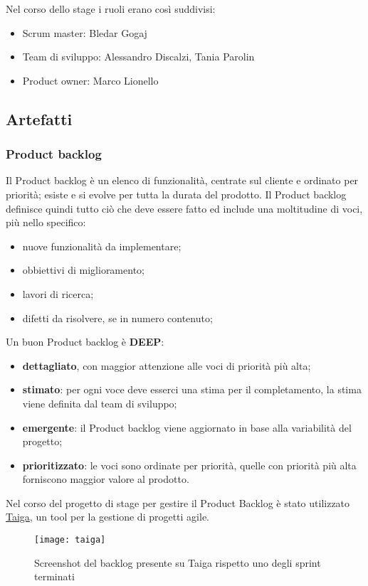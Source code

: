 Nel corso dello stage i ruoli erano così suddivisi:
\begin{itemize}
    \item Scrum master: Bledar Gogaj
    \item Team di sviluppo: Alessandro Discalzi, Tania Parolin
    \item Product owner: Marco Lionello
\end{itemize}

\subsection{Artefatti}

\subsubsection{Product backlog}
Il Product backlog è un elenco di funzionalità, centrate sul cliente e ordinato per priorità; esiste e si evolve per tutta la durata del prodotto. Il Product backlog definisce quindi tutto ciò che deve essere fatto ed include una moltitudine di voci, più nello specifico:
\begin{itemize}
    \item nuove funzionalità da implementare;
    \item obbiettivi di miglioramento;
    \item lavori di ricerca;
    \item difetti da risolvere, se in numero contenuto;
\end{itemize}
Un buon Product backlog è \textbf{DEEP}:
\begin{itemize}
    \item \textbf{dettagliato}, con maggior attenzione alle voci di priorità più alta;
    \item \textbf{stimato}: per ogni voce deve esserci una stima per il completamento, la stima viene definita dal team di sviluppo;
    \item \textbf{emergente}: il Product backlog viene aggiornato in base alla variabilità del progetto;
    \item \textbf{prioritizzato}: le voci sono ordinate per priorità, quelle con priorità più alta forniscono maggior valore al prodotto.
\end{itemize}
Nel corso del progetto di stage per gestire il Product Backlog è stato utilizzato \href{https://taiga.io/}{Taiga}, un tool per la gestione di progetti agile.
\begin{figure}[h]
    \begin{center}
    \texttt{[image: taiga]}
    \caption{Screenshot del backlog presente su Taiga rispetto uno degli sprint terminati}
    \label{fig:figure13}
    \end{center}
\end{figure}

